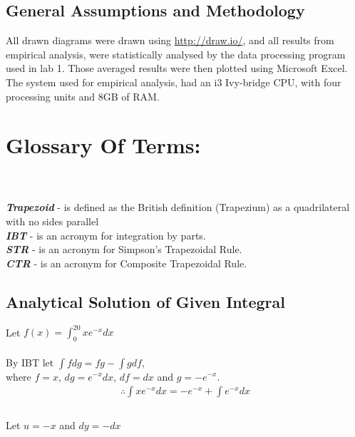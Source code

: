\documentclass[11pt]{article}
\begin{document}
\begin{page}
\clearpage
\setcounter{page}{1}

\section{General Assumptions and Methodology}
All drawn diagrams were drawn using \url{http://draw.io/}, and all results from empirical analysis, were statistically analysed by the data processing program used in lab 1. Those averaged results were then plotted using Microsoft Excel.\\

\noindent The system used for empirical analysis, had an i3 Ivy-bridge CPU, with four processing units and 8GB of RAM.\\

\noindent \large \chapter{\textbf{Glossary Of Terms:}}\\\\
\noindent \textbf{\textit{Trapezoid}} - is defined as the British definition (Trapezium) as a quadrilateral with no sides parallel \\
\noindent \textbf{\textit{IBT}} - is an acronym for integration by parts.\\
\noindent \textbf{\textit{STR}} - is an acronym for Simpson's Trapezoidal Rule.\\
\noindent \textbf{\textit{CTR}} - is an acronym for Composite Trapezoidal Rule.\\

\section{Analytical Solution of Given Integral}
\noindent Let $f(x) = \int_{0}^{20} xe^{-x} dx$\\
\\
\noindent By IBT let $\int fdg = fg - \int gdf$, \\
where $f = x$, $dg = e^{-x} dx$, $df = dx$ and $g = -e^{-x}$.\\

\begin{equation} 
\begin{aligned}
    \therefore{} \int xe^{-x} dx = -e^{-x} + \int e^{-x} dx\\ 
\end{aligned}
\end{equation}
\\
\noindent Let $u = -x$ and $dy = -dx$


\end{page}
\end{document}
